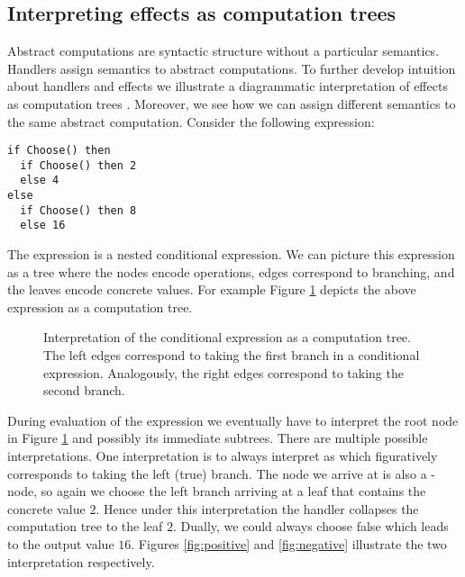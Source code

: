 \subsection{Interpreting effects as computation trees}\label{sec:effects-as-computation-trees}
Abstract computations are syntactic structure without a particular semantics. Handlers assign semantics to abstract computations.
To further develop intuition about handlers and effects we illustrate a diagrammatic interpretation of effects as computation trees \cite{Lindley2014}. Moreover, we see how we can assign different semantics to the same abstract computation. Consider the following expression:
\begin{lstlisting}[style=ocaml]
if Choose() then
  if Choose() then 2
  else 4
else
  if Choose() then 8
  else 16 
\end{lstlisting}
The expression is a nested conditional expression.
We can picture this expression as a tree where the nodes encode operations, edges correspond to branching, and the leaves encode concrete values. For example Figure \ref{fig:condexp} depicts the above expression as a computation tree.
\begin{figure}[t]
\begin{center}
\end{center}\caption{Interpretation of the conditional expression as a computation tree. The left edges correspond to taking the first branch in a conditional expression. Analogously, the right edges correspond to taking the second branch.}\label{fig:condexp}
\end{figure}
During evaluation of the expression we eventually have to interpret the root node  in Figure \ref{fig:condexp} and possibly its immediate subtrees.
There are multiple possible interpretations. One interpretation is to always interpret  as  which figuratively corresponds to taking the left (true) branch. The node we arrive at is also a -node, so again we choose the left branch arriving at a leaf that contains the concrete value $2$. Hence under this interpretation the handler collapses the computation tree to the leaf $2$. Dually, we could always choose false which leads to the output value $16$. Figures \ref{fig:positive} and \ref{fig:negative} illustrate the two interpretation respectively.
